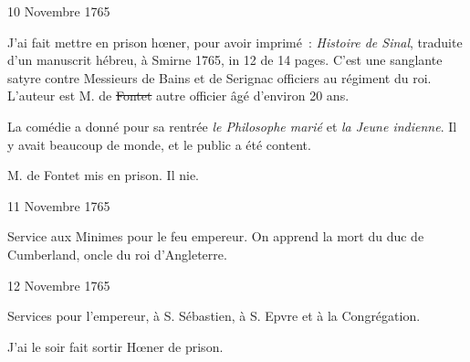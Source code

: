                      \begin{diary}{10 Novembre 1765}{}
                        
                         J'ai fait mettre en prison hœner, pour avoir
                           imprimé : \emph{Histoire de Sinal}, traduite
                           d'un
                           manuscrit hébreu, à Smirne
                           1765, in
                              12 de
                           14 pages. C'est une sanglante satyre contre
                           Messieurs
                           de Bains et de Serignac officiers au régiment
                           du roi. L'auteur est M. de
                                 \sout{Fontet} autre officier
                           âgé d'environ 20 ans. \bigskip
        
        
                         La comédie a donné pour sa rentrée
                              \emph{le
                              Philosophe marié} et \emph{la Jeune
                              indienne}.
                           Il y avait beaucoup de monde, et le public
                           a été content. \bigskip
        
        
                        
                           M. de Fontet mis en prison. Il nie.
                        \bigskip
        
        
                     \end{diary}

                     \begin{diary}{11 Novembre 1765}{}
                        
                         Service aux Minimes pour le feu empereur.
                           On apprend la mort du duc de
                              Cumberland,
                           oncle du roi d'Angleterre.
                        \bigskip
        
        
                     \end{diary}
                     
                     
                     \begin{diary}{12 Novembre 1765}{}
                        
                         Services pour l'empereur, à S. Sébastien, à
                           S. Epvre et à la Congrégation. \bigskip
        
        
                         J'ai le soir fait sortir Hœner de prison. \bigskip
        
        
                     \end{diary}

